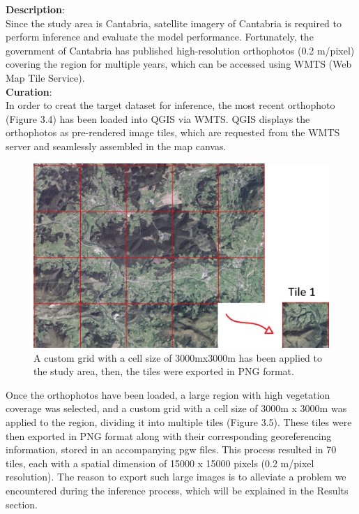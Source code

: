 \textbf{Description}: 
\\

Since the study area is Cantabria, satellite imagery of Cantabria is required to perform inference and evaluate the model performance. Fortunately, the government of Cantabria has published high-resolution orthophotos (0.2 m/pixel) covering the region for multiple years, which can be accessed using WMTS (Web Map Tile Service).\\

\textbf{Curation}: 
\\
In order to creat the target dataset for inference, the most recent orthophoto (Figure 3.4) has been loaded into QGIS via WMTS. QGIS displays the orthophotos as pre-rendered image tiles, which are requested from the WMTS server and seamlessly assembled in the map canvas.\\
\begin{figure}[H]
 \centering
 \includegraphics[scale=0.5]{IMAGENES/IMG13-Cantabria.png}
 \captionsetup{font=large}
 \caption {A custom grid with a cell size of 3000mx3000m has been applied to the study area, then, the tiles were exported in PNG format.}
\end{figure}
Once the orthophotos have been loaded, a large region with high vegetation coverage was selected, and a custom grid with a cell size of 3000m x 3000m was applied to the region, dividing it into multiple tiles (Figure 3.5). These tiles were then exported in PNG format along with their corresponding georeferencing information, 
stored in an accompanying pgw files. This process resulted in 70 tiles, each with a spatial dimension of 15000 x 15000 pixels (0.2 m/pixel resolution). The reason to export such large images is to alleviate a problem we encountered during the inference process, which will be explained in the Results section.\\ 

